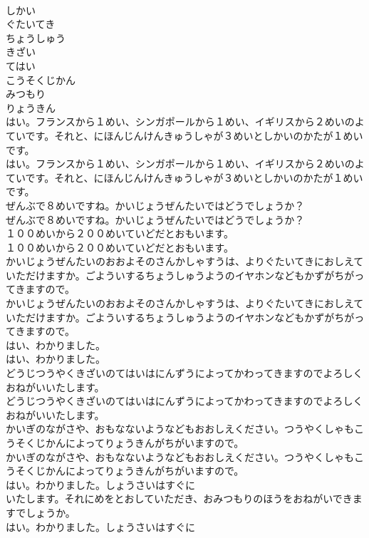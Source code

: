 \documentclass[8pt]{extreport}
\begin{document}
\begin{CJK}{UTF8}{min}
\\	しかい
\\	ぐたいてき
\\	ちょうしゅう
\\	きざい
\\	てはい
\\	こうそくじかん
\\	みつもり
\\	りょうきん
\\	はい。フランスから１めい、シンガポールから１めい、イギリスから２めいのよていです。それと、にほんじんけんきゅうしゃが３めいとしかいのかたが１めいです。
\\	はい。フランスから１めい、シンガポールから１めい、イギリスから２めいのよていです。それと、にほんじんけんきゅうしゃが３めいとしかいのかたが１めいです。
\\	ぜんぶで８めいですね。かいじょうぜんたいではどうでしょうか？
\\	ぜんぶで８めいですね。かいじょうぜんたいではどうでしょうか？
\\	１００めいから２００めいていどだとおもいます。
\\	１００めいから２００めいていどだとおもいます。
\\	かいじょうぜんたいのおおよそのさんかしゃすうは、よりぐたいてきにおしえていただけますか。ごよういするちょうしゅうようのイヤホンなどもかずがちがってきますので。
\\	かいじょうぜんたいのおおよそのさんかしゃすうは、よりぐたいてきにおしえていただけますか。ごよういするちょうしゅうようのイヤホンなどもかずがちがってきますので。
\\	はい、わかりました。
\\	はい、わかりました。
\\	どうじつうやくきざいのてはいはにんずうによってかわってきますのでよろしくおねがいいたします。
\\	どうじつうやくきざいのてはいはにんずうによってかわってきますのでよろしくおねがいいたします。
\\	かいぎのながさや、おもなないようなどもおおしえください。つうやくしゃもこうそくじかんによってりょうきんがちがいますので。
\\	かいぎのながさや、おもなないようなどもおおしえください。つうやくしゃもこうそくじかんによってりょうきんがちがいますので。
\\	はい。わかりました。しょうさいはすぐに
\\	いたします。それにめをとおしていただき、おみつもりのほうをおねがいできますでしょうか。
\\	はい。わかりました。しょうさいはすぐに

\end{CJK}
\end{document}
